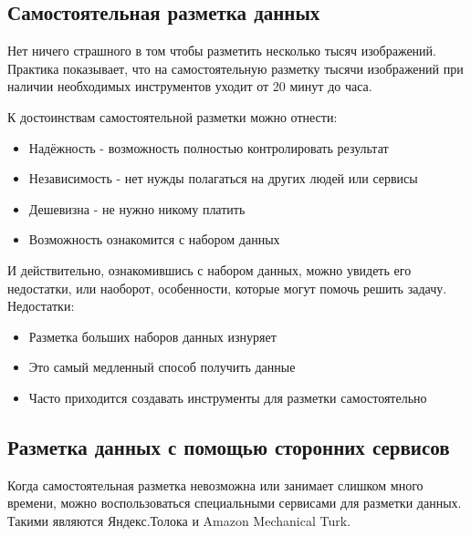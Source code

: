 \subsection{Самостоятельная разметка данных} \label{subsect1_3_1}
Нет ничего страшного в том чтобы разметить несколько тысяч изображений. Практика показывает, что на самостоятельную разметку тысячи изображений при наличии необходимых инструментов уходит от 20 минут до часа.

К достоинствам самостоятельной разметки можно отнести:
\begin{itemize}
    \item Надёжность - возможность полностью контролировать результат
    \item Независимость - нет нужды полагаться на других людей или сервисы
    \item Дешевизна - не нужно никому платить
    \item Возможность ознакомится с набором данных
\end{itemize}
И действительно, ознакомившись с набором данных, можно увидеть его недостатки, или наоборот, особенности, которые могут помочь решить задачу.
Недостатки:
\begin{itemize}
    \item Разметка больших наборов данных изнуряет
    \item Это самый медленный способ получить данные
    \item Часто приходится создавать инструменты для разметки самостоятельно
\end{itemize}


\subsection{Разметка данных с помощью сторонних сервисов} \label{subsect1_3_2}
Когда самостоятельная разметка невозможна или занимает слишком много времени, можно воспользоваться специальными сервисами для разметки данных. Такими являются Яндекс.Толока и Amazon Mechanical Turk.


